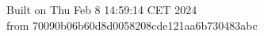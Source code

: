 {\noindent Built on Thu Feb  8 14:59:14 CET 2024} \\ 
 {\noindent from 70090b06b60d8d0058208cde121aa6b730483abc}
